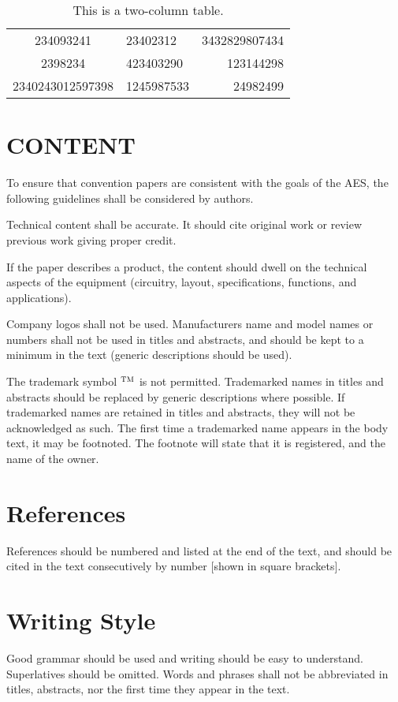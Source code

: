 \documentclass{aes130}
\begin{document}
\begin{table*}
\begin{center}
\begin{tabular}{|c|l|r|}
\hline
234093241&23402312&3432829807434\\
2398234&423403290&123144298\\
2340243012597398&1245987533&24982499\\
\hline
\end{tabular}
\caption{This is a two-column table.}
\end{center}
\end{table*}

\section{CONTENT}
To ensure that convention papers are consistent with the goals of the
AES, the following guidelines shall be considered by authors.

Technical content shall be accurate. It should cite original work or
review previous work giving proper credit.

If the paper describes a product, the content should dwell on the
technical aspects of the equipment (circuitry, layout, specifications,
functions, and applications). 

Company logos shall not be used. Manufacturers name and model names or
numbers shall not be used in titles and abstracts, and should be kept
to a minimum in the text (generic descriptions should be used).

The trademark symbol ${}^{\textsc{\scriptsize TM}}$ 
is not permitted. Trademarked names in titles
and abstracts should be replaced by generic descriptions where
possible. If trademarked names are retained in titles and abstracts,
they will not be acknowledged as such. The first time a trademarked
name appears in the body text, it may be footnoted. The footnote will
state that it is registered, and the name of the owner.



\section{References}
References should be numbered and listed at the end of the text, and
should be cited in the text consecutively by number [shown in
square brackets].

\section{Writing Style}
Good grammar should be used and writing should be easy to
understand. Superlatives should be omitted. Words and phrases shall
not be abbreviated in titles, abstracts, nor the first time they
appear in the text.
\end{document}
